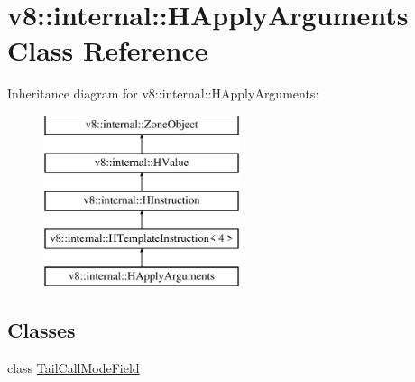 \hypertarget{classv8_1_1internal_1_1_h_apply_arguments}{}\section{v8\+:\+:internal\+:\+:H\+Apply\+Arguments Class Reference}
\label{classv8_1_1internal_1_1_h_apply_arguments}
Inheritance diagram for v8\+:\+:internal\+:\+:H\+Apply\+Arguments\+:\begin{figure}[H]
\begin{center}
\leavevmode
\includegraphics[height=5.000000cm]{classv8_1_1internal_1_1_h_apply_arguments}
\end{center}
\end{figure}
\subsection*{Classes}
\begin{DoxyCompactItemize}
\item 
class \hyperlink{classv8_1_1internal_1_1_h_apply_arguments_1_1_tail_call_mode_field}{Tail\+Call\+Mode\+Field}
\end{DoxyCompactItemize}
